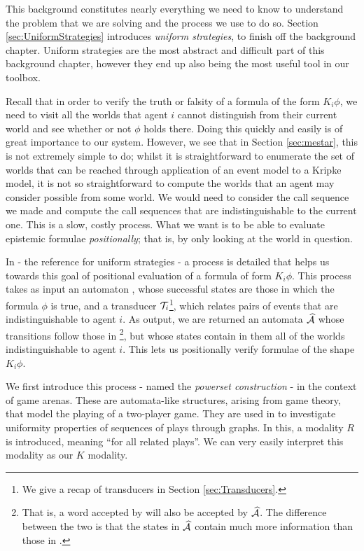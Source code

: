 \documentclass[10pt, a4paper]{report}
\begin{document}
This background constitutes nearly everything we need to know to understand the
problem that we are solving and the process we use to do so. Section
\ref{sec:UniformStrategies} introduces \emph{uniform strategies}, to finish off
the background chapter. Uniform strategies are the most abstract and difficult part of
this background chapter, however they end up also being the most useful tool in
our toolbox. 

Recall that in order to verify the truth or falsity of a formula of the form
$K_i \phi$, we need to visit all the worlds that agent $i$ cannot distinguish
from their current world and see whether or not $\phi$ holds there. Doing this
quickly and easily is of great importance to our system. However, we see that in
Section \ref{sec:mestar}, this is not extremely simple to do; whilst it is
straightforward to enumerate the set of worlds that can be reached through
application of an event model to a Kripke model, it is not so straightforward to
compute the worlds that an agent may consider possible from some world. We
would need to consider the call sequence we made and compute the call sequences
that are indistinguishable to the current one. This is a slow, costly process.
What we want is to be able to evaluate epistemic formulae \emph{positionally};
that is, by only looking at the world in question.

In \cite{UniformStrategies} - the reference for uniform strategies - a process
is detailed that helps us towards this goal of positional evaluation of a
formula of form $K_i \phi$. This process takes as input an automaton ,
whose successful states are those in which the formula $\phi$ is true, and a
transducer $\mathcal{T}_i$\footnote{We give a recap of transducers in Section
  \ref{sec:Transducers}.}, which relates pairs of events that are
indistinguishable to agent $i$. As output, we are returned an automata
$\widehat{\mathcal{A}}$ whose transitions follow those in \footnote{That is,
  a word accepted by  will also be accepted by $\widehat{\mathcal{A}}$. The
  difference between the two is that the states in $\widehat{\mathcal{A}}$ contain
  much more information than those in .}, but whose states
contain in them all of the worlds indistinguishable to agent $i$. This lets us
positionally verify formulae of the shape $K_i \phi$.

We first introduce this process - named the \emph{powerset construction} - in
the context of game arenas. These are automata-like structures, arising from
game theory, that model the playing of a two-player game. They are used in
\cite{UniformStrategies} to investigate uniformity properties of sequences of
plays through graphs. In this, a modality $R$ is introduced, meaning ``for all
related plays''. We can very easily interpret this modality as our $K$ modality. 
\end{document}
